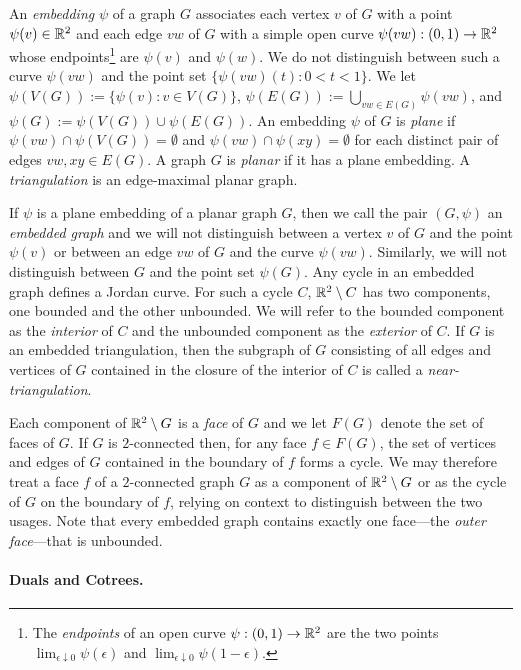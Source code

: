 \documentclass{patmorin}
\begin{document}
An \emph{embedding} $\psi$ of a graph $G$ associates each vertex $v$ of $G$ with a point $\psi(v)\in \mathbb{R}^2$ and each edge $vw$ of $G$ with a simple open curve $\psi(vw):(0,1)\to\mathbb{R}^2$ whose endpoints\footnote{The \emph{endpoints} of an open curve $\psi:(0,1)\to\mathbb{R}^2$ are the two points $\lim_{\epsilon\downarrow 0} \psi(\epsilon)$ and $\lim_{\epsilon\downarrow 0}\psi(1-\epsilon)$.} are $\psi(v)$ and $\psi(w)$.  We do not distinguish between such a curve $\psi(vw)$ and the point set $\{\psi(vw)(t):0<t<1\}$.
We let $\psi(V(G)):=\{\psi(v):v\in V(G)\}$, $\psi(E(G)):=\bigcup_{vw\in E(G)} \psi(vw)$, and $\psi(G):=\psi(V(G))\cup\psi(E(G))$.  An embedding $\psi$ of $G$ is \emph{plane} if $\psi(vw)\cap\psi(V(G))=\emptyset$ and $\psi(vw)\cap\psi(xy)=\emptyset$ for each distinct pair of edges $vw,xy\in E(G)$.  A graph $G$ is \emph{planar} if it has a plane embedding. A \emph{triangulation} is an edge-maximal planar graph.

If $\psi$ is a plane embedding of a planar graph $G$, then we call the pair $(G,\psi)$ an \emph{embedded graph} and we will not distinguish between a vertex $v$ of $G$ and the point $\psi(v)$ or between an edge $vw$ of $G$ and the curve $\psi(vw)$.  Similarly, we will not distinguish between $G$ and the  point set $\psi(G)$.  Any cycle in an embedded graph defines a Jordan curve. For such a cycle $C$, $\mathbb{R}^2\setminus C$ has two components, one bounded and the other unbounded. We will refer to the bounded component as the \emph{interior} of $C$ and the unbounded component as the \emph{exterior} of $C$.  If $G$ is an embedded triangulation, then the subgraph of $G$ consisting of all edges and vertices of $G$ contained in the closure of the interior of $C$ is called a \emph{near-triangulation}.

Each component of $\mathbb{R}^2\setminus G$ is a \emph{face} of $G$ and we let $F(G)$ denote the set of faces of $G$.  If $G$ is $2$-connected then, for any face $f\in F(G)$, the set of vertices and edges of $G$ contained in the boundary of $f$ forms a cycle.  We may therefore treat a face $f$ of a $2$-connected graph $G$ as a component of $\mathbb{R}^2\setminus G$ or as the cycle of $G$ on the boundary of $f$, relying on context to distinguish between the two usages.  Note that every embedded graph contains exactly one face---the \emph{outer face}---that is unbounded.

\paragraph{Duals and Cotrees.}
\end{document}
